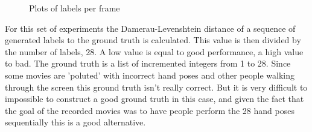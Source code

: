\begin{figure}[htbp]
\center{}
\hspace{0.02\linewidth}
\hspace{0.02\linewidth}
\caption{Plots of labels per frame}
\label{fig:performances}
\end{figure}

For this set of experiments the Damerau-Levenshtein distance of a sequence of generated labels to the ground truth is calculated. This value is then divided by the number of labels, 28. A low value is equal to good performance, a high value to bad. The ground truth is a list of incremented integers from 1 to 28. Since some movies are 'poluted' with incorrect hand poses and other people walking through the screen this ground truth isn't really correct. But it is very difficult to impossible to construct a good ground truth in this case, and given the fact that the goal of the recorded movies was to have people perform the 28 hand poses sequentially this is a good alternative. 

